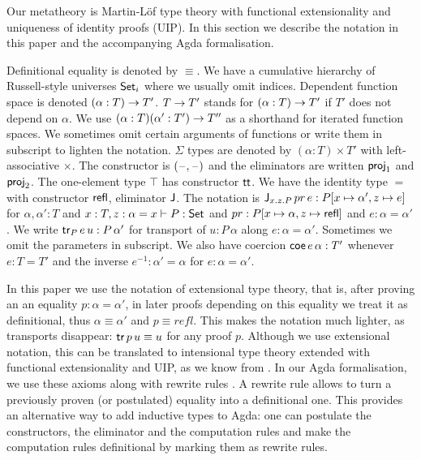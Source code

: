 \documentclass[acmsmall,review,anonymous]{acmart}\settopmatter{printfolios=true,printccs=false,printacmref=false}
\begin{document}
Our metatheory is Martin-L{\"o}f type theory with functional
extensionality and uniqueness of identity proofs (UIP). In this
section we describe the notation in this paper and the accompanying
Agda formalisation.

Definitional equality is denoted by $\equiv$. We have a cumulative
hierarchy of Russell-style universes $\Set_i$ where we usually omit
indices. Dependent function space is denoted $(\alpha:T)\ra T'$. $T\ra
T'$ stands for $(\alpha:T)\ra T'$ if $T'$ does not depend on
$\alpha$. We use $(\alpha:T)(\alpha': T')\ra T''$ as a shorthand for
iterated function spaces. We sometimes omit certain arguments of
functions or write them in subscript to lighten the notation.
$\Sigma$ types are denoted by $(\alpha:T)\times T'$ with
left-associative $\times$. The constructor is $(\blank,\blank)$ and
the eliminators are written $\proj_1$ and $\proj_2$. The one-element
type $\top$ has constructor $\tt$. We have the identity type $=$ with
constructor $\refl$, eliminator $\J$. The notation is
$\J_{x.z.P}\,pr\,e:P[x\mapsto\alpha',z\mapsto e]$ for
$\alpha,\alpha':T$ and $x:T, z:\alpha=x \vdash P:\Set$ and
$pr:P[x\mapsto \alpha,z\mapsto\refl]$ and $e :\alpha=\alpha'$. We
write $\tr_P\,e\,u: P\,\alpha'$ for transport of $u : P\,\alpha$ along
$e :\alpha=\alpha'$. Sometimes we omit the parameters in subscript. We
also have coercion $\coe\,e\,\alpha:T'$ whenever $e:T=T'$ and the
inverse $e^{-1}:\alpha'=\alpha$ for $e:\alpha=\alpha'$.

In this paper we use the notation of extensional type theory, that is,
after proving an an equality $p : \alpha=\alpha'$, in later proofs
depending on this equality we treat it as definitional, thus
$\alpha\equiv\alpha'$ and $p \equiv refl$. This makes the notation
much lighter, as transports disappear: $\tr\,p\,u\equiv u$ for any
proof $p$. Although we use extensional notation, this can
be translated to intensional type theory extended with functional
extensionality and UIP, as we know from
\cite{hofmann95conservativity, Oury2005,theo}. In our Agda formalisation, we use these axioms
along with rewrite rules \cite{cockx}. A
rewrite rule allows to turn a previously proven (or postulated)
equality into a definitional one. %
This provides
an alternative way to add inductive types to Agda: one can postulate
the constructors, the eliminator and the computation rules and make
the computation rules definitional by marking them as rewrite rules.
\end{document}
